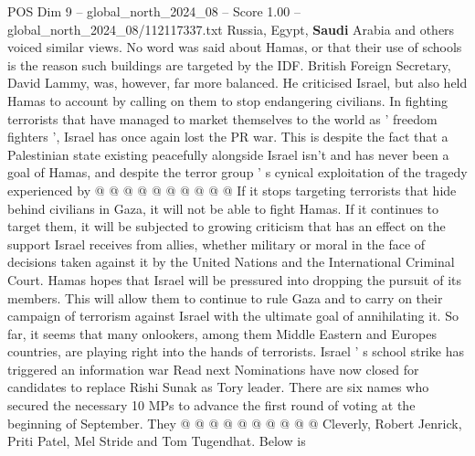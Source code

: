 \begin{textsample}{POS Dim 9 – global\_north\_2024\_08 – Score 1.00 – global\_north\_2024\_08/112117337.txt}
Russia, Egypt, \textbf{Saudi} Arabia and others voiced similar views.
No word was said about Hamas, or that their use of schools is the reason such buildings are targeted by the IDF.
British Foreign Secretary, David Lammy, was, however, far more balanced.
He criticised Israel, but also held Hamas to account by calling on them to stop endangering civilians.
In fighting terrorists that have managed to market themselves to the world as ' freedom fighters ', Israel has once again lost the PR war.
This is despite the fact that a Palestinian state existing peacefully alongside Israel isn't and has never been a goal of Hamas, and despite the terror group ' s cynical exploitation of the tragedy experienced by @ @ @ @ @ @ @ @ @ @ If it stops targeting terrorists that hide behind civilians in Gaza, it will not be able to fight Hamas.
If it continues to target them, it will be subjected to growing criticism that has an effect on the support Israel receives from allies, whether military or moral in the face of decisions taken against it by the United Nations and the International Criminal Court.
Hamas hopes that Israel will be pressured into dropping the pursuit of its members.
This will allow them to continue to rule Gaza and to carry on their campaign of terrorism against Israel with the ultimate goal of annihilating it.
So far, it seems that many onlookers, among them Middle Eastern and Europes countries, are playing right into the hands of terrorists.
Israel ' s school strike has triggered an information war Read next Nominations have now closed for candidates to replace Rishi Sunak as Tory leader.
There are six names who secured the necessary 10 MPs to advance the first round of voting at the beginning of September.
They @ @ @ @ @ @ @ @ @ @ Cleverly, Robert Jenrick, Priti Patel, Mel Stride and Tom Tugendhat.
Below is

\end{textsample}
